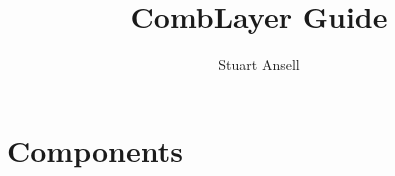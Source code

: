 \documentclass{article}
\title{CombLayer Guide}
\author{Stuart Ansell}
\begin{document}
\maketitle
\tableofcontents








\section{Components}



\end{document}
